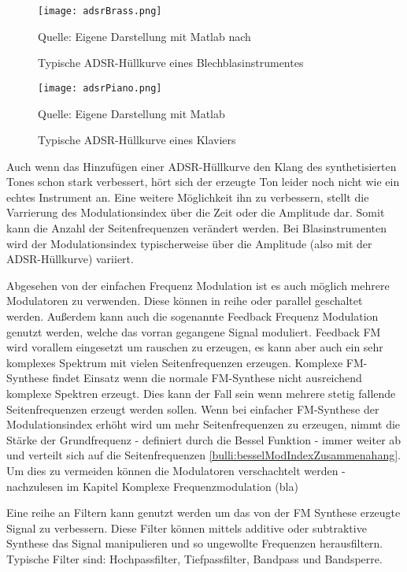 \begin{figure} [ht]
\centering
  \texttt{[image: adsrBrass.png]}
\caption{Typische ADSR-Hüllkurve eines Blechblasinstrumentes}
\label{fig:adsrBrass}
Quelle: Eigene Darstellung mit Matlab nach \cite{chowningPaper}
\end{figure}

\begin{figure} [ht]
\centering
  \texttt{[image: adsrPiano.png]}
\caption{Typische ADSR-Hüllkurve eines Klaviers}
\label{fig:adsrPiano}
Quelle: Eigene Darstellung mit Matlab
\end{figure}

Auch wenn das Hinzufügen einer ADSR-Hüllkurve den Klang des synthetisierten Tones schon stark verbessert, hört sich der erzeugte Ton leider noch nicht wie ein echtes Instrument an. Eine weitere Möglichkeit ihn zu verbessern, stellt die Varrierung des Modulationsindex über die Zeit oder die Amplitude dar. Somit kann die Anzahl der Seitenfrequenzen verändert werden. Bei Blasinstrumenten wird der Modulationsindex typischerweise über die Amplitude (also mit der ADSR-Hüllkurve) variiert. \cite[S. 532]{chowningPaper}

Abgesehen von der einfachen Frequenz Modulation ist es auch möglich mehrere Modulatoren zu verwenden. Diese können in reihe oder parallel geschaltet werden. Außerdem kann auch die sogenannte Feedback Frequenz Modulation genutzt werden, welche das vorran gegangene Signal moduliert. \cite[S. 399 f.]{hornerPaper} Feedback FM wird vorallem eingesetzt um rauschen zu erzeugen, es kann aber auch ein sehr komplexes Spektrum mit vielen Seitenfrequenzen erzeugen. Komplexe FM-Synthese findet Einsatz wenn die normale FM-Synthese nicht ausreichend komplexe Spektren erzeugt. Dies kann der Fall sein wenn mehrere stetig fallende Seitenfrequenzen erzeugt werden sollen. Wenn bei einfacher FM-Synthese der Modulationsindex erhöht wird um mehr Seitenfrequenzen zu erzeugen, nimmt die Stärke der Grundfrequenz - definiert durch die Bessel Funktion - immer weiter ab und verteilt sich auf die Seitenfrequenzen \ref{bulli:besselModIndexZusammenahang}. Um dies zu vermeiden können die Modulatoren verschachtelt werden - nachzulesen im Kapitel Komplexe Frequenzmodulation (bla)

Eine reihe an Filtern kann genutzt werden um das von der FM Synthese erzeugte Signal zu verbessern. Diese Filter können mittels additive oder subtraktive Synthese das Signal manipulieren und so ungewollte Frequenzen herausfiltern. Typische Filter sind: Hochpassfilter, Tiefpassfilter, Bandpass und Bandsperre. \cite[S. 100-104]{stotz}

